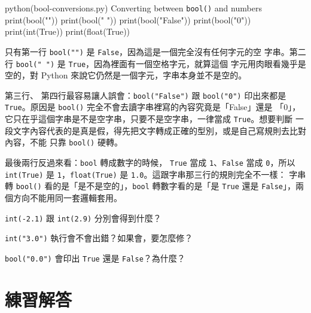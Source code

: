 \begin{example}{python}{(bool-conversions.py) Converting between \texttt{bool()} and numbers}
print(bool(""))
print(bool(" "))
print(bool("False"))
print(bool("0"))
print(int(True))
print(float(True))
\end{example}


只有第一行 \texttt{bool("")} 是 \texttt{False}，因為這是一個完全沒有任何字元的空
字串。第二行 \texttt{bool(" ")} 是 \texttt{True}，因為裡面有一個空格字元，就算這個
字元用肉眼看幾乎是空的，對 Python 來說它仍然是一個字元，字串本身並不是空的。

第三行、
第四行最容易讓人誤會：\texttt{bool("False")} 跟 \texttt{bool("0")} 印出來都是
\texttt{True}。原因是 \texttt{bool()} 完全不會去讀字串裡寫的內容究竟是「False」還是
「0」，它只在乎這個字串是不是空字串，只要不是空字串，一律當成 \texttt{True}。想要判斷
一段文字內容代表的是真是假，得先把文字轉成正確的型別，或是自己寫規則去比對內容，不能
只靠 \texttt{bool()} 硬轉。

最後兩行反過來看：\texttt{bool} 轉成數字的時候，
\texttt{True} 當成 \texttt{1}、\texttt{False} 當成 \texttt{0}，所以 \texttt{int(True)}
是 \texttt{1}，\texttt{float(True)} 是 \texttt{1.0}。這跟字串那三行的規則完全不一樣：
字串轉 \texttt{bool()} 看的是「是不是空的」，\texttt{bool} 轉數字看的是「是
\texttt{True} 還是 \texttt{False}」，兩個方向不能用同一套邏輯套用。


\begin{drills}[label=drills:conversion-edge-cases]
\item \texttt{int(-2.1)} 跟 \texttt{int(2.9)} 分別會得到什麼？
\item \texttt{int("3.0")} 執行會不會出錯？如果會，要怎麼修？
\item \texttt{bool("0.0")} 會印出 \texttt{True} 還是 \texttt{False}？為什麼？
\end{drills}

\section*{練習解答}

